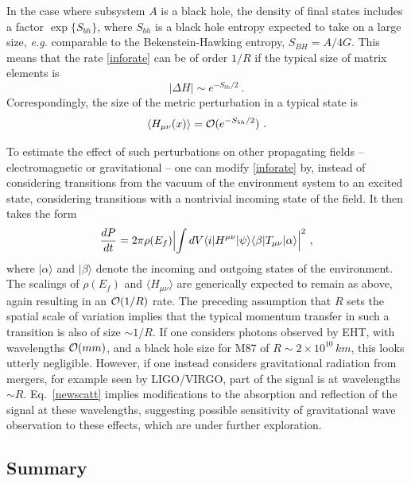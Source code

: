 \documentclass[11pt]{article}
\numberwithin{equation}{section}
\newcommand{\calo}{{\cal O}}
\newcommand{\beq}{\begin{equation}}
\newcommand{\eeq}{\end{equation}}
\begin{document}
In the case where subsystem $A$ is a black hole, the density of final states includes a factor $\exp\{S_{bh}\}$, where $S_{bh}$ is a black hole entropy expected to take on a large size, {\it e.g.} comparable to the Bekenstein-Hawking entropy, $S_{BH}=A/4G$.  This means that the rate \eqref{inforate} can be of order $1/R$ if the typical size of matrix elements is\cite{NVU}
\beq
|\Delta H|\sim e^{-S_{bh}/2}\ .
\eeq
Correspondingly, the  size of the metric perturbation in a typical state is
\beq\label{incmet}
\langle H_{\mu\nu}(x)\rangle ={\cal O}(e^{-S_{bh}/2})\ .
\eeq

To estimate the effect of such perturbations on other propagating fields -- electromagnetic or gravitational -- one can modify \eqref{inforate} by, instead of considering transitions from the vacuum of the environment system to an excited state, considering transitions with a nontrivial incoming state of the field.  It then takes the form
\beq\label{newscatt}
\frac{dP}{dt}=2\pi\rho(E_f) \Bigl|\int dV \langle i| H^{\mu\nu}|\psi\rangle\langle \beta| T_{\mu\nu}|\alpha\rangle\Bigr|^2\ ,
\eeq
where $|\alpha\rangle$ and $|\beta\rangle$ denote the incoming and outgoing states of the environment.  The scalings of $\rho(E_f)$ and $\langle H_{\mu\nu}\rangle$ are generically expected to remain as above, again resulting in an $\calo(1/R)$ rate.  
The preceding assumption that $R$ sets the spatial scale of variation implies that the typical momentum transfer in such a transition is also of size $\sim 1/R$.  If one considers photons observed by EHT, with wavelengths $\calo(mm)$, and a black hole size for M87 of $R\sim 2\times 10^{10}\, km$, this looks utterly negligible.  However, if one instead considers gravitational radiation from mergers, for example seen by LIGO/VIRGO, part of the signal is at wavelengths $\sim R$.  Eq.~\eqref{newscatt} implies modifications to the absorption and reflection of the signal at these wavelengths, suggesting possible sensitivity of gravitational wave observation to these effects\cite{SGsearch}\cite{BHQU}, which are under further exploration.

\subsection{Summary}
\end{document}
